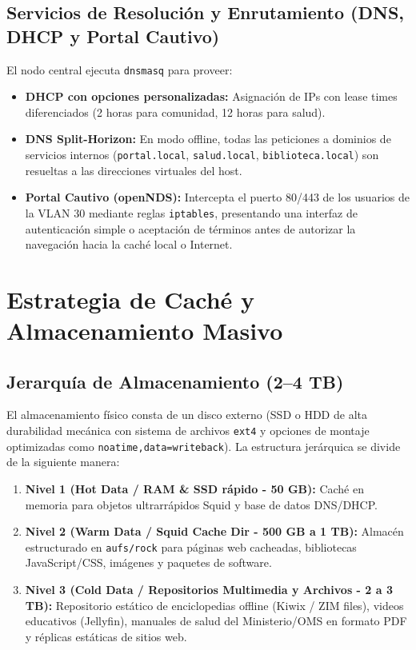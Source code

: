 \documentclass[conference]{IEEEtran}
\begin{document}
\subsection{Servicios de Resolución y Enrutamiento (DNS, DHCP y Portal Cautivo)}
El nodo central ejecuta \texttt{dnsmasq} para proveer:
\begin{itemize}
    \item \textbf{DHCP con opciones personalizadas:} Asignación de IPs con lease times diferenciados (2 horas para comunidad, 12 horas para salud).
    \item \textbf{DNS Split-Horizon:} En modo offline, todas las peticiones a dominios de servicios internos (\texttt{portal.local}, \texttt{salud.local}, \texttt{biblioteca.local}) son resueltas a las direcciones virtuales del host.
    \item \textbf{Portal Cautivo (openNDS):} Intercepta el puerto 80/443 de los usuarios de la VLAN 30 mediante reglas \texttt{iptables}, presentando una interfaz de autenticación simple o aceptación de términos antes de autorizar la navegación hacia la caché local o Internet.
\end{itemize}

\section{Estrategia de Caché y Almacenamiento Masivo}

\subsection{Jerarquía de Almacenamiento (2--4 TB)}
El almacenamiento físico consta de un disco externo (SSD o HDD de alta durabilidad mecánica con sistema de archivos \texttt{ext4} y opciones de montaje optimizadas como \texttt{noatime,data=writeback}). La estructura jerárquica se divide de la siguiente manera:
\begin{enumerate}
    \item \textbf{Nivel 1 (Hot Data / RAM \& SSD rápido - 50 GB):} Caché en memoria para objetos ultrarrápidos Squid y base de datos DNS/DHCP.
    \item \textbf{Nivel 2 (Warm Data / Squid Cache Dir - 500 GB a 1 TB):} Almacén estructurado en \texttt{aufs/rock} para páginas web cacheadas, bibliotecas JavaScript/CSS, imágenes y paquetes de software.
    \item \textbf{Nivel 3 (Cold Data / Repositorios Multimedia y Archivos - 2 a 3 TB):} Repositorio estático de enciclopedias offline (Kiwix / ZIM files), videos educativos (Jellyfin), manuales de salud del Ministerio/OMS en formato PDF y réplicas estáticas de sitios web.
\end{enumerate}
\end{document}
